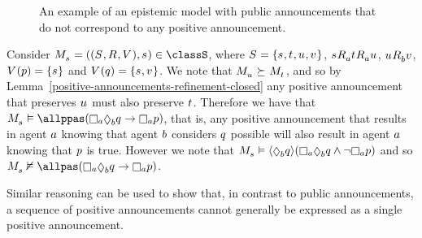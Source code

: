 \begin{example}\label{example-papal-differences}
    \begin{figure}
        \caption{An example of an epistemic model with public announcements that do not correspond to any positive announcement.}\label{example-epistemic-model-2}
        \centering
    \end{figure}

    Consider $\kPModelAndTuple{\kStateS} \in \classS$, where $\kStates = \{\kStateS, \kStateT, \kStateU, \kStateV\}$, $\kStateS \kAccessibility{\agentA} \kStateT \kAccessibility{\agentA} \kStateU$, $\kStateU \kAccessibility{\agentB} \kStateV$, $\kValuation(\atomP) = \{\kStateS\}$ and $\kValuation(\atomQ) = \{\kStateS, \kStateV\}$.
    We note that $\kPModel{\kStateU} \simulates \kPModel{\kStateT}$, and so by Lemma~\ref{positive-announcements-refinement-closed} any positive announcement that preserves $\kStateU$ must also preserve $\kStateT$.
    Therefore we have that $\kPModel{\kStateS} \entails \allppas (\knows[\agentA] \suspects[\agentB] \atomQ \implies \knows[\agentA] \atomP)$, that is, any positive announcement that results in agent $a$ knowing that agent $b$ considers $q$ possible will also result in agent $a$ knowing that $p$ is true.
    However we note that $\kPModel{\kStateS} \entails \announceE{\suspects[\agentB] \atomQ} (\knows[\agentA] \suspects[\agentB] \atomQ \land \neg \knows[\agentA] \atomP)$ and so $\kPModel{\kStateS} \nentails \allpas (\knows[\agentA] \suspects[\agentB] \atomQ \implies \knows[\agentA] \atomP)$.
\end{example}

Similar reasoning can be used to show that, in contrast to public announcements, a sequence of positive announcements cannot generally be expressed as a single positive announcement.

